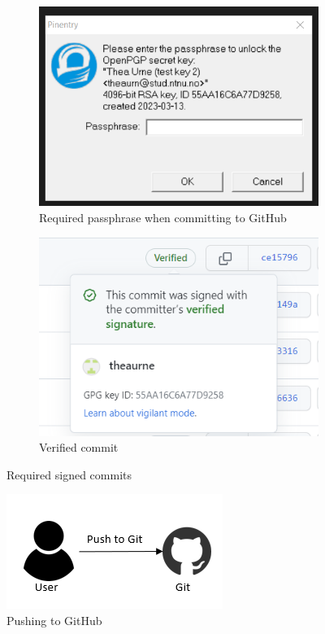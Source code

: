 \begin{figure}[H]
  \centering
  \begin{subfigure}[H]{0.4\textwidth}
    \includegraphics[width=\textwidth]{Images/signedcommits.png}
    \caption{Required passphrase when committing to GitHub}
    \label{fig:image1}
  \end{subfigure}
  \hfill
  \begin{subfigure}[H]{0.4\textwidth}
    \includegraphics[width=\textwidth]{Images/verified-commit.png}
    \caption{Verified commit}
    \label{fig:image2}
  \end{subfigure}
  \caption{Required signed commits}
  \label{fig:overall}
\end{figure}

\vspace{2mm}
\begin{figure}[H]
    \centering
    \includegraphics[width=0.5\columnwidth]{Images/aws-piplin-1.png}
    \caption{Pushing to GitHub}
    \label{fig: Pushing to GitHub}
\end{figure}



